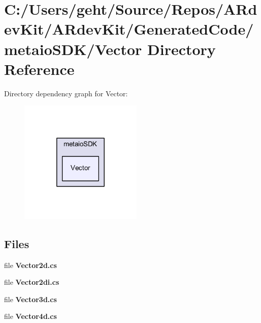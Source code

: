 \section{C\-:/\-Users/geht/\-Source/\-Repos/\-A\-Rdev\-Kit/\-A\-Rdev\-Kit/\-Generated\-Code/metaio\-S\-D\-K/\-Vector Directory Reference}
\label{dir_fcfbc83e180e64ed5914eadf375a5870}
Directory dependency graph for Vector\-:
\nopagebreak
\begin{figure}[H]
\begin{center}
\leavevmode
\includegraphics[width=166pt]{dir_fcfbc83e180e64ed5914eadf375a5870_dep}
\end{center}
\end{figure}
\subsection*{Files}
\begin{DoxyCompactItemize}
\item 
file {\bfseries Vector2d.\-cs}
\item 
file {\bfseries Vector2di.\-cs}
\item 
file {\bfseries Vector3d.\-cs}
\item 
file {\bfseries Vector4d.\-cs}
\end{DoxyCompactItemize}
